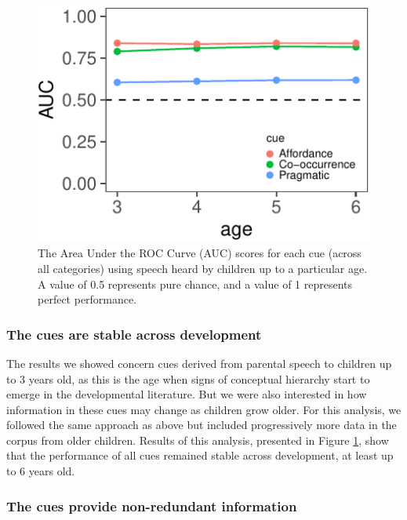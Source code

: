 \documentclass[10pt, letterpaper]{article}
\newenvironment{CodeChunk}{}{}
\begin{document}
\begin{CodeChunk}
\begin{figure}[t]
{\centering \includegraphics{cogsci_files/figure-latex/dev-1}

}

\caption{\label{fig:dev}The Area Under the ROC Curve (AUC) scores for each cue (across all categories) using speech heard by children up to a particular age. A value of 0.5 represents pure chance, and a value of 1 represents perfect performance. }\label{fig:dev}
\end{figure}
\end{CodeChunk}

\hypertarget{the-cues-are-stable-across-development}{%
\subsubsection{The cues are stable across
development}\label{the-cues-are-stable-across-development}}

The results we showed concern cues derived from parental speech to children up to 3
years old, as this is the age when signs of conceptual hierarchy start
to emerge in the developmental literature. But we were also interested
in how information in these cues may change as children grow older.
For this analysis, we followed the same approach as above but included progressively more data in the corpus from older children. Results of this analysis, presented in Figure \ref{fig:dev}, show that the performance of all cues
remained stable across development, at least up to 6 years old.

\hypertarget{the-cues-provide-non-redundant-information}{%
\subsubsection{The cues provide non-redundant
information}\label{the-cues-provide-non-redundant-information}}
%
\end{document}
